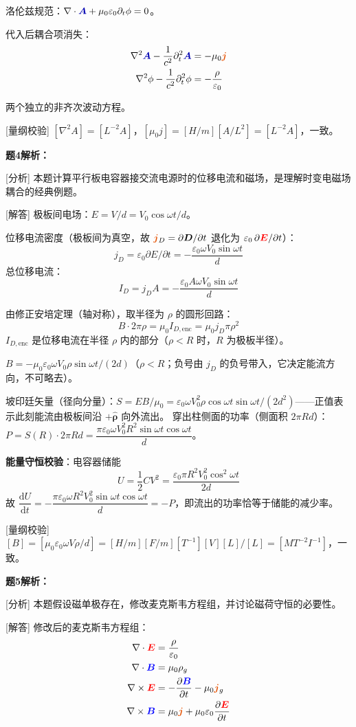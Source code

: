 \documentclass[11pt,a4paper,openany,oneside]{book}
\newcommand{\diff}{\mathrm{d}}
\newcommand{\vecE}{\textcolor{red}{\vect{E}}}
\newcommand{\vecB}{\textcolor{blue}{\vect{B}}}
\newcommand{\vecJ}{\textcolor{cororange}{\vect{j}}}
\newcommand{\vecA}{\textcolor{blue!70!black}{\vect{A}}}
\newcommand{\eps}{\varepsilon}
\newcommand{\muz}{\mu_0}
\newcommand{\vect}[1]{\bm{#1}}
\newcommand{\unitvec}[1]{\hat{\vect{#1}}}
\newcommand{\curl}{\nabla\times}
\newcommand{\divg}{\nabla\cdot}
\newcommand{\lap}{\nabla^2}
\begin{document}
洛伦兹规范：$\divg\vecA + \muz\eps_0\partial_t\phi = 0$。

代入后耦合项消失：
\begin{align*}
\lap\vecA - \frac{1}{c^2}\partial_t^2\vecA &= -\muz\vecJ \\
\lap\phi - \frac{1}{c^2}\partial_t^2\phi &= -\frac{\rho}{\eps_0}
\end{align*}

两个独立的非齐次波动方程。\qedsymbol

[量纲校验] $[\lap A] = [L^{-2}A]$，$[\muz j] = [H/m][A/L^2] = [L^{-2}A]$，一致。\qedsymbol

\textbf{题4解析：}

[分析] 本题计算平行板电容器接交流电源时的位移电流和磁场，是理解时变电磁场耦合的经典例题。

[解答] 极板间电场：$E = V/d = V_0\cos\omega t/d$。

位移电流密度（极板间为真空，故 $\vecJ_D = \partial\vect D/\partial t$ 退化为 $\eps_0\,\partial\vecE/\partial t$）：
\[
j_D = \eps_0\partial E/\partial t = -\frac{\eps_0\omega V_0\sin\omega t}{d}
\]
总位移电流：
\[
I_D = j_D A = -\frac{\eps_0 A\omega V_0\sin\omega t}{d}
\]

由修正安培定理（轴对称），取半径为 $\rho$ 的圆形回路：
\[
B \cdot 2\pi\rho = \muz I_{D,\text{enc}} = \muz j_D \pi\rho^2
\]
$I_{D,\text{enc}}$ 是位移电流在半径 $\rho$ 内的部分（$\rho < R$ 时，$R$ 为极板半径）。

$B = -\muz\eps_0\omega V_0\rho\sin\omega t/(2d)$（$\rho < R$；负号由 $j_D$ 的负号带入，它决定能流方向，不可略去）。

坡印廷矢量（径向分量）：$S = EB/\muz = \eps_0\omega V_0^2\rho\cos\omega t\sin\omega t/(2d^2)$——正值表示此刻能流由极板间沿 $+\unitvec{\rho}$ 向外流出。
穿出柱侧面的功率（侧面积 $2\pi R d$）：$P = S(R)\cdot 2\pi R d = \dfrac{\pi\eps_0\omega V_0^2R^2\sin\omega t\cos\omega t}{d}$。\qedsymbol

\textbf{能量守恒校验}：电容器储能
\[
U = \frac{1}{2}CV^2 = \dfrac{\eps_0\pi R^2V_0^2\cos^2\omega t}{2d}
\]
故 $\dfrac{\diff U}{\diff t} = -\dfrac{\pi\eps_0\omega R^2V_0^2\sin\omega t\cos\omega t}{d} = -P$，即流出的功率恰等于储能的减少率。

[量纲校验] $[B] = [\muz\eps_0\omega V\rho/d] = [H/m][F/m][T^{-1}][V][L]/[L] = [MT^{-2}I^{-1}]$，一致。\qedsymbol

\textbf{题5解析：}

[分析] 本题假设磁单极存在，修改麦克斯韦方程组，并讨论磁荷守恒的必要性。

[解答] 修改后的麦克斯韦方程组：
\begin{align*}
\divg\vecE &= \frac{\rho}{\eps_0} \\
\divg\vecB &= \mu_0\rho_g \\
\curl\vecE &= -\frac{\partial\vecB}{\partial t} - \mu_0\vecJ_g \\
\curl\vecB &= \muz\vecJ + \muz\eps_0\frac{\partial\vecE}{\partial t}
\end{align*}
\end{document}
